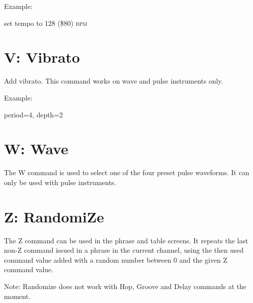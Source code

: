 \begin{description}
\item Example:
\item[T80] set tempo to 128 (\$80) \textsc{bpm}
\end{description}

\section{V: Vibrato}

Add vibrato. This command works on wave and pulse instruments only.

\begin{description}
\item Example:
\item[V42] period=4, depth=2
\end{description}

\section{W: Wave}

The W command is used to select one of the four preset pulse waveforms. It can only be used with pulse instruments.

\section{Z: RandomiZe}

The Z command can be used in the phrase and table screens. It repeats the last non-Z command issued in a phrase in the current channel, using the then used command value added with a random number between 0 and the given Z command value.

Note: Randomize does not work with Hop, Groove and Delay commands at the moment.
